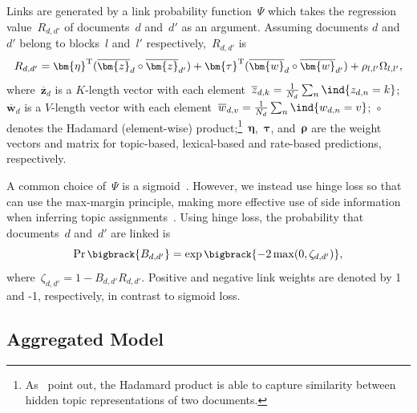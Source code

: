 Links are generated by a link probability function~$\Psi$ which
takes the regression value~$R_{d,d'}$ of documents~$d$ and~$d'$ as
an argument.  Assuming documents $d$ and $d'$ belong to blocks~$l$ and~$l'$
respectively,~$R_{d,d'}$ is
\begin{equation}\label{equ:regression}
\small
R_{d,d'} = \bm{\eta}^\mathrm{T} (\overline{\bm{z}}_d \circ \overline{\bm{z}}_{d'}) + \bm{\tau}^\mathrm{T} (\overline{\bm{w}}_d \circ \overline{\bm{w}}_{d'}) + \rho_{l, l'} \Omega_{l, l'},
\end{equation}
where~$\overline{\bm{z}}_d$ is a $K$-length vector with each element~$\overline{z}_{d,k} = \frac{1}{N_d} \sum_{n} \ind{z_{d,n} = k}$;~$\overline{\bm{w}}_d$ is a $V$-length vector with each element~$\overline{w}_{d,v} = \frac{1}{N_d} \sum_{n} \ind{w_{d,n} = v}$;~$\circ$ denotes the Hadamard (element-wise) product;\footnote{As~ point out, the Hadamard product is able to capture similarity between hidden topic representations of two documents.}~$\bm{\eta}$,~$\bm{\tau}$, and~$\bm{\rho}$ are the weight vectors and matrix for topic-based,
lexical-based and rate-based predictions, respectively.

A common choice of~$\Psi$ is a sigmoid~\cite{chang-2010-rtm}.
However, we instead use hinge loss so that \vfrtm can use the
max-margin principle, making more effective use of side information
when inferring topic assignments~\cite{zhu-2012-medlda}.  Using hinge
loss, the probability that documents~$d$ and~$d'$ are linked is
\begin{equation}\label{equ:psi_hinge}
\small
\Pr \bigbrack{B_{d,d'}} = \exp \bigbrack{-2 \max (0, \zeta_{d,d'})},
\end{equation}
where~$\zeta_{d,d'} = 1 - B_{d,d'} R_{d,d'}$. Positive and negative
link weights are denoted by 1 and -1, respectively, in contrast to
sigmoid loss.

\subsection{Aggregated Model}
\label{ssec:lex_wsb_rtm}

